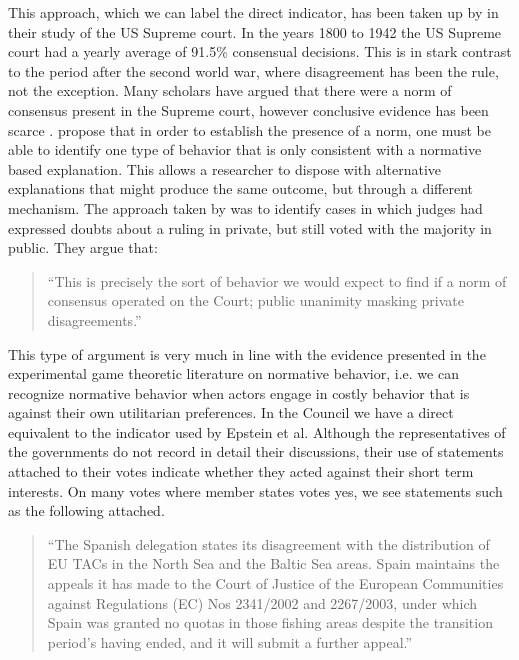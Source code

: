 This approach, which we can label the direct indicator, has been taken up by \citet{EpsteinSegalSpaeth2001} in their study of the US Supreme court. In the years 1800 to 1942 the US Supreme court had a yearly average of 91.5\% consensual decisions. This is in stark contrast to the period after the second world war, where disagreement has been the rule, not the exception.  Many scholars have argued that there were a norm of consensus present in the Supreme court, however conclusive evidence has been scarce \citep{Haynie1992,EpsteinKnight1996,CalderiaZorn1998,Epstein2001}. \citet{Epstein2001} propose that in order to establish the presence of a norm, one must be able to identify one type of behavior that is only consistent with a normative based explanation. This allows a researcher to dispose with alternative explanations that might produce the same outcome, but through a different mechanism. The approach taken by \citet{Epstein2001} was to identify cases in which judges had expressed doubts about a ruling in private, but still voted with the majority in public.  They argue that:

\begin{quote}
  ``This is precisely the sort of behavior we would expect to find if a norm of consensus operated on the Court; public unanimity masking private disagreements.''
\end{quote}

This type of argument is very much in line with the evidence presented in the experimental game theoretic literature on normative behavior, i.e. we can recognize normative behavior when actors engage in costly behavior that is against their own utilitarian preferences. In the Council we have a direct equivalent to the indicator used by Epstein et al. Although the representatives of the governments do not record in detail their discussions, their use of statements attached to their votes indicate whether they acted against their short term interests. On many votes where member states votes yes, we see statements such as the following attached.

\begin{quote}
  ``The Spanish delegation states its disagreement with the distribution of EU TACs in the North Sea and the Baltic Sea areas. Spain maintains the appeals it has made to the Court of Justice of the European Communities against Regulations (EC) Nos 2341/2002 and 2267/2003, under which Spain was granted no quotas in those fishing areas despite the transition period’s having ended, and it will submit a further appeal.''
\end{quote}

